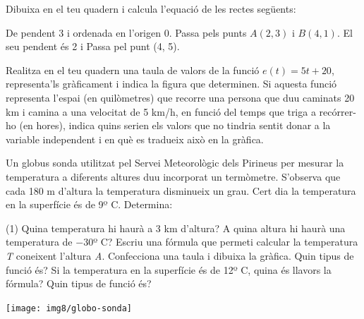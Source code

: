 \begin{mylist}
\answers{[$y=2x+3$, $y=-x+4$, $y=0$, $y=-2x+1$]}	
	
	\exer  Dibuixa en el teu quadern i calcula l'equació de les rectes següents:
	\begin{tasks}
		\task   De pendent 3 i ordenada en l'origen 0.
		\task   Passa pels punts $A( 2, 3)$ i $B(4, 1)$.
		\task   El seu pendent és 2 i Passa  pel punt (4, 5).
	\end{tasks}
	
\answers{[$y=3x$, $y=-x+5$, $y=2x-3$]}
	
	
\exer  Realitza en el teu quadern una taula de valors de la funció $e(\textit{t}) = 5\textit{t} + 20$, representa'ls gràficament i indica la figura que determinen. Si aquesta funció representa l'espai (en quilòmetres) que recorre una persona que duu caminats 20 km i camina a una velocitat de 5 km/h, en funció del temps que triga a recórrer-ho (en hores), indica quins serien els valors que no tindria sentit donar a la variable independent i en què es tradueix això en la gràfica. 
 
 
 
 \vspace{-4.5cm}
 \exer \begin{minipage}[t]{0.82\textwidth}
 	Un globus sonda utilitzat pel Servei Meteorològic dels Pirineus per mesurar la temperatura a diferents altures duu incorporat un termòmetre. S'observa que cada 180 m d'altura la temperatura disminueix un grau. Cert dia la temperatura en la superfície és de 9º C. Determina:\vspace{0.2cm}
 	
 	\begin{tasks}(1)
 		\task Quina temperatura hi haurà a 3 km d'altura? \vspace{0.1cm}
 		\task  A quina altura hi haurà una temperatura de $-$30º C? \vspace{0.1cm}
 		\task  Escriu una fórmula que permeti calcular la temperatura \textit{T} coneixent l'altura \textit{A}. Confecciona una taula i dibuixa la gràfica. Quin tipus de funció és? \vspace{0.1cm}
 		\task  Si la temperatura en la superfície és de 12º C, quina és llavors la fórmula? Quin tipus de funció és?
 	\end{tasks}
 \end{minipage}
 \hspace{0.5cm}
 \begin{minipage}{0.1\textwidth}
 	\centering
 	\vspace{4.5cm}
 	\texttt{[image: img8/globo-sonda]}
 \end{minipage}
 

\end{mylist}
